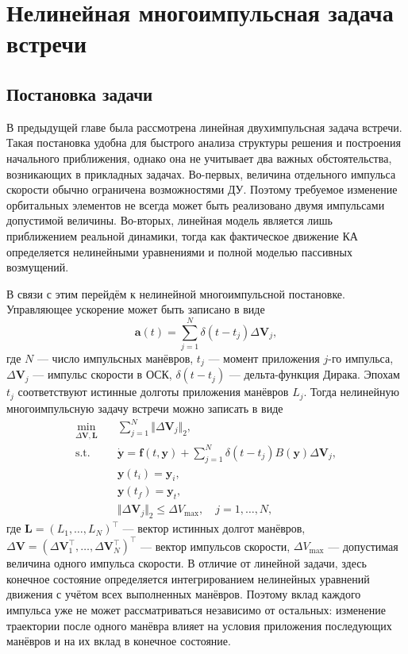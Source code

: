 \section{Нелинейная многоимпульсная задача встречи}

\subsection{Постановка задачи}

В предыдущей главе была рассмотрена линейная двухимпульсная задача встречи. Такая постановка удобна для быстрого анализа структуры решения и построения начального приближения, однако она не учитывает два важных обстоятельства, возникающих в прикладных задачах. Во-первых, величина отдельного импульса скорости обычно ограничена возможностями ДУ. Поэтому требуемое изменение орбитальных элементов не всегда может быть реализовано двумя импульсами допустимой величины. Во-вторых, линейная модель является лишь приближением реальной динамики, тогда как фактическое движение КА определяется нелинейными уравнениями и полной моделью пассивных возмущений.

В связи с этим перейдём к нелинейной многоимпульсной постановке. Управляющее ускорение может быть записано в виде
\begin{equation*}
    \mathbf{a}(t) = \sum_{j=1}^N \delta(t - t_j) \Delta \mathbf{V}_j,
\end{equation*}
где $N$ --- число импульсных манёвров, $t_j$ --- момент приложения $j$-го импульса, $\Delta \mathbf{V}_j$ --- импульс скорости в ОСК, $\delta(t - t_j)$ --- дельта-функция Дирака. Эпохам $t_j$ соответствуют истинные долготы приложения манёвров $L_j$. Тогда нелинейную многоимпульсную задачу встречи можно записать в виде
\begin{equation}
\begin{aligned}
    \min_{\Delta \mathbf{V}, \mathbf{L}} \quad &\sum_{j=1}^N \Vert \Delta \mathbf{V}_j \Vert_2, \\
    \text{s.t.} \quad &\dot{\mathbf{y}} = \mathbf{f}(t, \mathbf{y}) + \sum_{j=1}^N \delta(t - t_j) B(\mathbf{y}) \Delta \mathbf{V}_j, \\
    &\mathbf{y}(t_i) = \mathbf{y}_i, \\
    &\mathbf{y}(t_f) = \mathbf{y}_t, \\
    &\Vert \Delta \mathbf{V}_j \Vert_2 \leq \Delta V_{\text{max}}, \quad j = 1, \dots, N,
\end{aligned}
\label{problem_N_imp_non_linear}
\end{equation}
где $\mathbf{L} = \left( L_1, \dots, L_N \right)^\top$ --- вектор истинных долгот манёвров, $\Delta \mathbf{V} = \left( \Delta \mathbf{V}_1^\top, \dots, \Delta \mathbf{V}_N^\top \right)^\top$ --- вектор импульсов скорости, $\Delta V_{\text{max}}$ --- допустимая величина одного импульса скорости. В отличие от линейной задачи, здесь конечное состояние определяется интегрированием нелинейных уравнений движения с учётом всех выполненных манёвров. Поэтому вклад каждого импульса уже не может рассматриваться независимо от остальных: изменение траектории после одного манёвра влияет на условия приложения последующих манёвров и на их вклад в конечное состояние.

